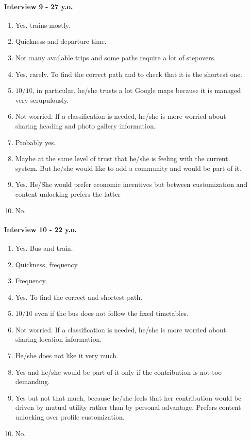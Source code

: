 \documentclass[a4paper, 10pt]{IEEEtran}
\begin{document}
\paragraph*{Interview 9 - 27 y.o.}

\begin{enumerate}
    \item Yes, trains mostly.
    \item Quickness and departure time.
    \item Not many available trips and some paths require a lot of stepovers.
    \item Yes, rarely. To find the correct path and to check that it is the shortest one.
    \item $10/10$, in particular, he/she trusts a lot Google maps because it is managed very scrupulously.
    \item Not worried. If a classification is needed, he/she is more worried about sharing heading and photo gallery information.
    \item Probably yes.
    \item Maybe at the same level of trust that he/she is feeling with the current system. But he/she would like to add a community and would be part of it.
    \item Yes. He/She would prefer economic incentives but between customization and content unlocking prefers the latter
    \item No.
\end{enumerate}

\paragraph*{Interview 10 - 22 y.o.}
\begin{enumerate}
    \item Yes. Bus and train.
    \item Quickness, frequency
    \item Frequency.
    \item Yes. To find the correct and shortest path.
    \item $10/10$ even if the bus does not follow the fixed timetables.
    \item Not worried.  If a classification is needed, he/she is more worried about sharing location information.
    \item He/she does not like it very much.
    \item Yes and he/she would be part of it only if the contribution is not too demanding.
    \item Yes but not that much, because he/she feels that her contribution would be driven by mutual utility rather than by personal advantage. Prefers content unlocking over profile customization.
    \item No.
\end{enumerate}
\end{document}
